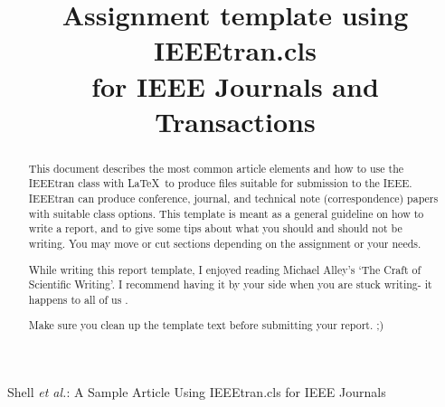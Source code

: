 \documentclass[conference]{IEEEtran}
\begin{document}
\title{Assignment template using IEEEtran.cls\\ for IEEE Journals and Transactions}

\author{
	\and
	\and
}
%
{Shell \MakeLowercase{\textit{et al.}}: A Sample Article Using IEEEtran.cls for IEEE Journals}


\maketitle

\begin{abstract}
	This document describes the most common article elements and how to use the IEEEtran class with \LaTeX \ to produce files suitable for submission to the IEEE.  IEEEtran can produce conference, journal, and technical note (correspondence) papers with suitable class options.
	This template is meant as a general guideline on how to write a report, and to give some tips about what you should and should not be writing. You may move or cut sections depending on the assignment or your needs.

	While writing this report template, I enjoyed reading Michael Alley's `The Craft of Scientific Writing'. I recommend having it by your side when you are stuck writing- it happens to all of us \cite{AlleyMichael2018TCoS}.

	Make sure you clean up the template text before submitting your report. ;)
\end{abstract}
\end{document}
